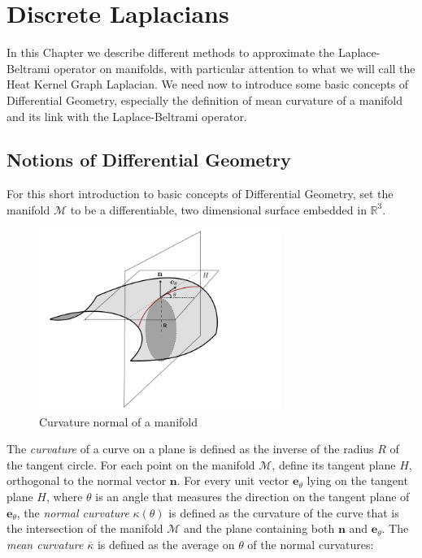
\section{Discrete Laplacians}\label{sec:Chapter3: other discrete laplacians}
In this Chapter we describe different methods to approximate the Laplace-Beltrami operator on manifolds, with particular attention to what we will call the Heat Kernel Graph Laplacian. We need now to introduce some basic concepts of Differential Geometry, especially the definition of mean curvature of a manifold and its link with the Laplace-Beltrami operator.
\subsection{Notions of Differential Geometry}

 For this short introduction to basic concepts of Differential Geometry, set the manifold $\mathcal M$ to be a differentiable, two dimensional surface embedded in $\mathbb R^3$. 
 \begin{figure}[h]
 	\centering
 	\includegraphics[width=0.7\textwidth]{figs/Chapter3/curvature.png}
 	\caption{\label{fig:curvature}Curvature normal of a manifold}
 \end{figure} 
The \textit{curvature} of a curve on a plane is defined as the inverse of the radius $R$ of the tangent circle. For each point on the manifold $\mathcal M$, define its tangent plane $H$, orthogonal to the normal vector $\mathbf n$. For every unit vector $\mathbf e_\theta$ lying on the tangent plane $H$, where $\theta$ is an angle that measures the direction on the tangent plane of $\mathbf e_\theta$, the \textit{normal curvature} $\kappa(\theta)$ is defined as the curvature of the curve that is the intersection of the manifold $\mathcal M$ and the plane containing both $\mathbf n$ and $\mathbf e_\theta$. The \textit{mean curvature} $\overline \kappa $ is defined as the average on $\theta$ of the normal curvatures:
 
